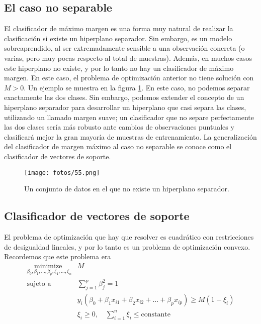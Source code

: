 \subsection{El caso no separable}

El clasificador de máximo margen es una forma muy natural de realizar la clasificación si existe un hiperplano separador. Sin embargo, es un modelo sobreaprendido, al ser extremadamente sensible a una observación concreta (o varias, pero muy pocas respecto al total de muestras). Además, en muchos casos este hiperplano no existe, y por lo tanto no hay un clasificador de máximo margen. En este caso, el problema de optimización anterior no tiene solución con $M > 0$. Un ejemplo se muestra en la figura \ref{fig:9.4}. En este caso, no podemos separar exactamente las dos clases. Sin embargo, podemos extender el concepto de un hiperplano separador para desarrollar un hiperplano que casi separa las clases, utilizando un llamado margen suave; un clasificador que no separe perfectamente las dos clases sería más robusto ante cambios de observaciones puntuales y clasificará mejor la gran mayoría de muestras de entrenamiento. La generalización del clasificador de margen máximo al caso no separable se conoce como el clasificador de vectores de soporte.

\begin{figure}[h]
\centering
\texttt{[image: fotos/55.png]}
\caption{Un conjunto de datos en el que no existe un hiperplano separador.}
\label{fig:9.4}
\end{figure}


\subsection{Clasificador de vectores de soporte}

El problema de optimización que hay que resolver es cuadrático con restricciones de desigualdad lineales, y por lo tanto es un problema de optimización convexo. Recordemos que este problema era 
\begin{align}
\underset{\beta_0, \beta_1, \dots, \beta_p, \xi_1, \dots, \xi_n}{\text{minimize }} & M \\
\text{sujeto a } \quad & \sum_{j = 1}^p \beta_j^2 = 1 \\
&y_i (\beta_0 + \beta_1 x_{i1} + \beta_2 x_{i2} + \ldots + \beta_p x_{ip}) \geq M(1 - \xi_i) \\
&\xi_i \geq 0, \quad \sum_{i = 1}^n \xi_i \leq \text{constante}
\end{align}

